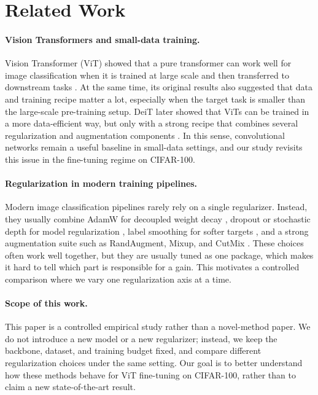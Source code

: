 \section{Related Work}
\label{sec:related}


\paragraph{Vision Transformers and small-data training.}
Vision Transformer (ViT) showed that a pure transformer can work well for image classification when it is trained at large scale and then transferred to downstream tasks \citep{dosovitskiy2021vit}. At the same time, its original results also suggested that data and training recipe matter a lot, especially when the target task is smaller than the large-scale pre-training setup. DeiT later showed that ViTs can be trained in a more data-efficient way, but only with a strong recipe that combines several regularization and augmentation components \citep{touvron2021deit}. In this sense, convolutional networks remain a useful baseline in small-data settings, and our study revisits this issue in the fine-tuning regime on CIFAR-100.

\paragraph{Regularization in modern training pipelines.}
Modern image classification pipelines rarely rely on a single regularizer. Instead, they usually combine AdamW for decoupled weight decay \citep{loshchilov2019adamw}, dropout or stochastic depth for model regularization \citep{srivastava2014dropout,huang2016stochasticdepth}, label smoothing for softer targets \citep{szegedy2016rethinking,muller2019labelsmoothing}, and a strong augmentation suite such as RandAugment, Mixup, and CutMix \citep{cubuk2020randaugment,zhang2018mixup,yun2019cutmix}. These choices often work well together, but they are usually tuned as one package, which makes it hard to tell which part is responsible for a gain. This motivates a controlled comparison where we vary one regularization axis at a time.

\paragraph{Scope of this work.}
This paper is a controlled empirical study rather than a novel-method paper. We do not introduce a new model or a new regularizer; instead, we keep the backbone, dataset, and training budget fixed, and compare different regularization choices under the same setting. Our goal is to better understand how these methods behave for ViT fine-tuning on CIFAR-100, rather than to claim a new state-of-the-art result.


